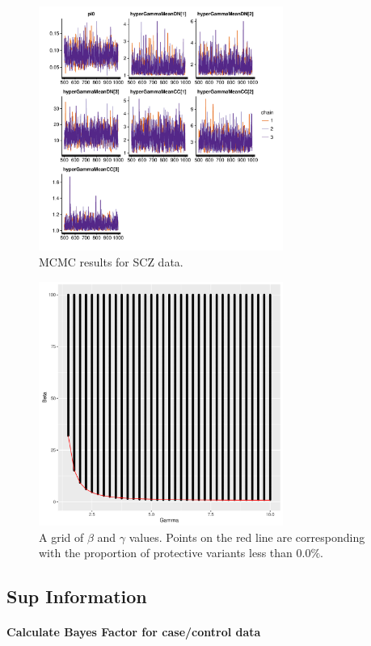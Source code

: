 \documentclass[]{article}
\begin{document}
\begin{figure}[H]
\includegraphics[width=\textwidth,height=8cm]{Picture/MCMCtraceplotSCZ_combinedCC.pdf}
\caption{MCMC results for SCZ data.}
\label{fig:tracePlotMCMCforSCZ}
\end{figure}


\begin{figure}[H]
\includegraphics[width=\textwidth, height=8cm]{Picture/BetaAndGammaCorrelation.pdf}
\caption{A grid of $\beta$ and $\gamma$ values. Points on the red line
are corresponding with the proportion of protective variants less than
0.0$\%$.}
\label{fig:nonlinearRelationBetaAndGamma}
\end{figure}




\subsection{Sup Information}
\label{sec:supInformation}

\paragraph{Calculate Bayes Factor for case/control data}
\end{document}
